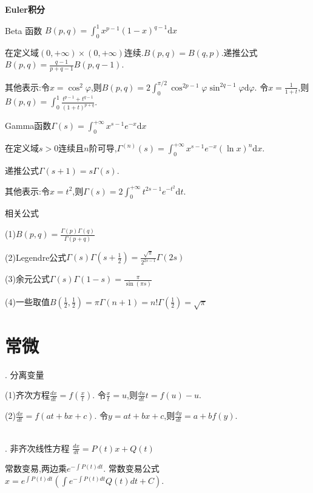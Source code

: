 \documentclass[UTF8]{ctexart}
\begin{document}
\noindent \textbf{Euler积分}\par 
\noindent Beta 函数 $B(p,q)=\int _0^1 x^{p-1}(1-x)^{q-1}\mathrm{d}x$\par 
在定义域$(0,+\infty)\times(0,+\infty)$连续.$B(p,q)=B(q,p)$.递推公式$B(p,q)=\frac{q-1}{p+q-1}B(p,q-1)$.\par 
其他表示:令$x=\cos ^2\varphi$,则$B(p, q)=2 \int_{0}^{\pi / 2} \cos ^{2p-1} \varphi \sin ^{2q-1}\varphi \mathrm{d} \varphi$.
令$x=\frac{1}{1+t}$,则$B(p,q)=\int_0^1 \frac{t^{p-1}+t^{q-1}}{(1+t)^{p+q}}$.\par 

\noindent Gamma函数$\Gamma(s)=\int _0^{+\infty}x^{s-1}e^{-x}\mathrm{d}x$ \par 
在定义域$s>0$连续且$n$阶可导,$\Gamma^{(n)}(s)=\int _0^{+\infty}x^{s-1}e^{-x}(\ln x)^n\mathrm{d}x$.\par 
递推公式$\Gamma (s+1)=s\Gamma(s)$.\par 
其他表示:令$x=t^2$,则$\Gamma(s)=2\int _0^{+\infty}t^{2s-1}e^{-t^2}\mathrm{d}t$.

\noindent 相关公式\par 
(1)$B(p,q)=\frac{\Gamma(p)\Gamma(q)}{\Gamma(p+q)}$\par 
(2)Legendre公式\quad $\Gamma(s)\Gamma(s+\frac{1}{2})=\frac{\sqrt{\pi}}{2^{2s-1}}\Gamma(2s)$\par 
(3)余元公式\quad $\Gamma(s)\Gamma(1-s)=\frac{\pi}{\sin (\pi s)}$\par 
(4)一些取值\quad $B(\frac{1}{2},\frac{1}{2})=\pi$\quad $\Gamma(n+1)=n!$\quad $\Gamma(\frac{1}{2})=\sqrt{\pi }$


\section{常微}

. 分离变量 \par
(1)齐次方程$\frac{dx}{dt}=f(\frac{x}{t})$. 令$\frac{x}{t}=u$,则$\frac{du}{dt}t=f(u)-u$.\par
(2)$\frac{dx}{dt}=f(at+bx+c)$. 令$y=at+bx+c$,则$\frac{dy}{dt}=a+bf(y)$.\par
~\\

. 非齐次线性方程 $\frac{dx}{dt}=P(t)x+Q(t)$\par
常数变易,两边乘$e^{-\int P(t)dt}$. 常数变易公式$x=e^{\int P(t)dt}(\int e^{-\int P(t)dt}Q(t)dt+C)$.
~\\
\end{document}
